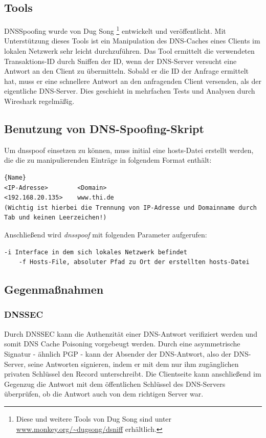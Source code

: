 \subsection*{Tools}
DNSSpoofing wurde von Dug Song \footnote{Diese und weitere Tools von Dug Song sind unter \url{www.monkey.org/~dugsong/dsniff} erhältlich.} entwickelt und veröffentlicht. Mit Unterstützung dieses Tools ist ein Manipulation des DNS-Caches eines Clients im lokalen
Netzwerk sehr leicht durchzuführen. Das Tool ermittelt die verwendeten Transaktions-ID durch Sniffen der ID, wenn der DNS-Server versucht eine Antwort an den Client zu übermitteln. Sobald er die ID der
Anfrage ermittelt hat, muss er eine schnellere Antwort an den anfragenden Client versenden, als der eigentliche DNS-Server. Dies geschieht in mehrfachen Tests und Analysen durch Wireshark regelmäßig. \\

\subsection*{Benutzung von DNS-Spoofing-Skript}
Um dnsspoof einsetzen zu können, muss initial eine hosts-Datei erstellt werden, die die zu manipulierenden Einträge in folgendem Format enthält: \newline

\begin{lstlisting}[caption=Beispiel für eine Hosts-Datei]{Name}
<IP-Adresse>		<Domain>
<192.168.20.135>	www.thi.de
(Wichtig ist hierbei die Trennung von IP-Adresse und Domainname durch Tab und keinen Leerzeichen!)
\end{lstlisting}

Anschließend wird \textit{dnsspoof} mit folgenden Parameter aufgerufen: \newline

\begin{lstlisting}[caption=Parameter für dnsspoof]
	-i Interface in dem sich lokales Netzwerk befindet
	-f Hosts-File, absoluter Pfad zu Ort der erstellten hosts-Datei
\end{lstlisting}
	


\subsection*{Gegenmaßnahmen}

\subsubsection*{DNSSEC}
Durch DNSSEC kann die Authenzität einer DNS-Antwort verifiziert werden und somit DNS Cache Poisoning vorgebeugt werden. Durch eine asymmetrische Signatur -  ähnlich PGP - kann der Absender
der DNS-Antwort, also der DNS-Server, seine Antworten signieren, indem er mit dem nur ihm zugänglichen privaten Schlüssel den Record unterschreibt. Die Clientseite kann anschließend im 
Gegenzug die Antwort mit dem öffentlichen Schlüssel des DNS-Servers überprüfen, ob die Antwort auch von dem richtigen Server war.\newpage

